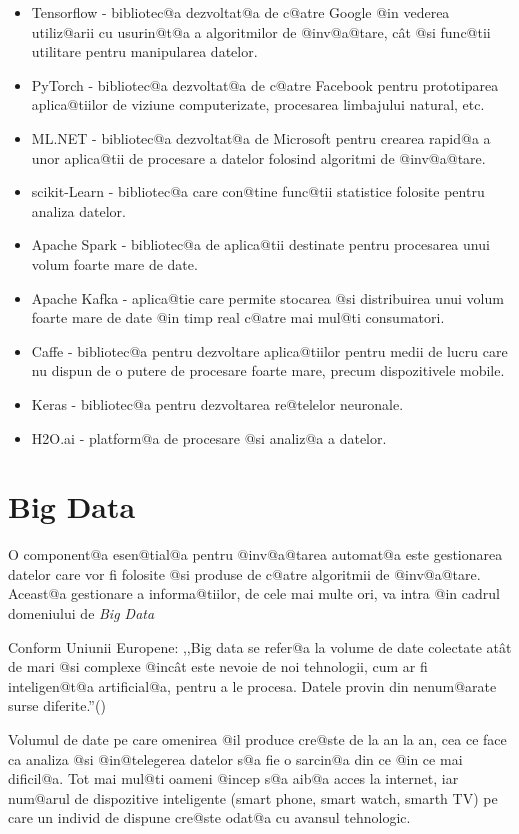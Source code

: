\begin{itemize}
	\item Tensorflow - bibliotec@a dezvoltat@a de c@atre Google @in vederea utiliz@arii cu usurin@t@a a algoritmilor de @inv@a@tare, c\^ at @si func@tii utilitare pentru manipularea datelor.
	\item PyTorch - bibliotec@a dezvoltat@a de c@atre Facebook pentru prototiparea aplica@tiilor de viziune computerizate, procesarea limbajului natural, etc.
	\item ML.NET - bibliotec@a dezvoltat@a de Microsoft pentru crearea rapid@a a unor aplica@tii de procesare a datelor folosind algoritmi de @inv@a@tare.
	\item scikit-Learn - bibliotec@a care con@tine func@tii statistice folosite pentru analiza datelor.
	\item Apache Spark - bibliotec@a de aplica@tii destinate pentru procesarea unui volum foarte mare de date.
	\item Apache Kafka - aplica@tie care permite stocarea @si distribuirea unui volum foarte mare de date @in timp real c@atre mai mul@ti consumatori.
	\item Caffe - bibliotec@a pentru dezvoltare aplica@tiilor pentru medii de lucru care nu dispun de o putere de procesare foarte mare, precum dispozitivele mobile.
	\item Keras - bibliotec@a pentru dezvoltarea re@telelor neuronale.
	\item H2O.ai - platform@a de procesare @si analiz@a a datelor.
	
\end{itemize}


\section{Big Data}


O component@a esen@tial@a pentru @inv@a@tarea automat@a este gestionarea datelor care vor fi folosite @si produse de c@atre algoritmii de @inv@a@tare. Aceast@a gestionare a informa@tiilor, de cele mai multe ori, va intra @in cadrul domeniului de {\sl Big Data }

Conform Uniunii Europene: ,,Big data se refer@a la volume de date colectate at\^ at de mari @si complexe @inc\^ at este nevoie de noi tehnologii, cum ar fi inteligen@t@a artificial@a, pentru a le procesa. Datele provin din nenum@arate surse diferite.''(\cite{eu-big-data-definition})

Volumul de date pe care omenirea @il produce cre@ste de la an la an, cea ce face ca analiza @si @in@telegerea datelor s@a fie o sarcin@a din ce @in ce mai dificil@a. Tot mai mul@ti oameni @incep s@a aib@a acces la internet, iar num@arul de dispozitive inteligente (smart phone, smart watch, smarth TV) pe care un individ de dispune cre@ste odat@a cu avansul tehnologic.

